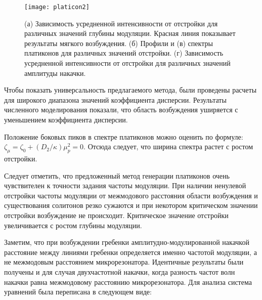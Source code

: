 \begin{figure}
  \centering
  \texttt{[image: platicon2]}
  \caption{(а) Зависимость усредненной интенсивности от отстройки для различных значений глубины модуляции. Красная линия показывает результаты мягкого возбуждения. (б) Профили и (в) спектры платиконов для различных значений отстройки. (г) Зависимость усредненной интенсивности от отстройки для различных значений амплитуды накачки.} \label{platicon2}
\end{figure}

Чтобы показать универсальность предлагаемого метода, были проведены расчеты для широкого диапазона значений коэффициента дисперсии. Результаты численного моделирования показали, что область возбуждения уширяется с уменьшением коэффициента дисперсии. %


Положение боковых пиков в спектре платиконов можно оценить по формуле: $\zeta_\mu=\zeta_0+(D_2/\kappa)\mu^2_p=0$. Отсюда следует, что ширина спектра растет с ростом отстройки.

Следует отметить, что предложенный метод генерации платиконов очень чувствителен к точности задания частоты модуляции. При наличии ненулевой отстройки частоты модуляции от межмодового расстояния области возбуждения и существования солитонов резко сужаются и при некотором критическом значении отстройки возбуждение не происходит. Критическое значение отстройки увеличивается с ростом глубины модуляции.


Заметим, что при возбуждении гребенки амплитудно-модулированной накачкой расстояние между линиями гребенки определяется именно частотой модуляции, а не межмодовым расстоянием микрорезонатора.
Идентичные результаты были получены и для случая двухчастотной накачки, когда разность частот волн накачки равна межмодовому расстоянию микрорезонатора. Для анализа система уравнений была переписана в следующем виде:

